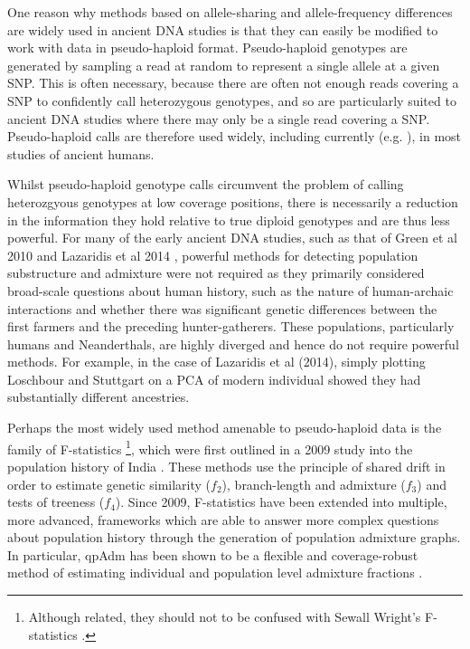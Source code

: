 One reason why methods based on allele-sharing and allele-frequency differences are widely used in ancient DNA studies is that they can easily be modified to work with data in pseudo-haploid format. Pseudo-haploid genotypes are generated by sampling a read at random to represent a single allele at a given SNP. This is often necessary, because there are often not enough reads covering a SNP to confidently call heterozygous genotypes, and so are particularly suited to ancient DNA studies where there may only be a single read covering a SNP. Pseudo-haploid calls are therefore used widely, including currently (e.g. \cite{sirak2021social}), in most studies of ancient humans. 

Whilst pseudo-haploid genotype calls circumvent the problem of calling heterozgyous genotypes at low coverage positions, there is necessarily a reduction in the information they hold relative to true diploid genotypes and are thus less powerful. For many of the early ancient DNA studies, such as that of Green et al 2010 \cite{Green2010} and Lazaridis et al 2014 \cite{Lazaridis2014}, powerful methods for detecting population substructure and admixture were not required as they primarily considered broad-scale questions about human history, such as the nature of human-archaic interactions and whether there was significant genetic differences between the first farmers and the preceding hunter-gatherers. These populations, particularly humans and Neanderthals, are highly diverged and hence do not require powerful methods. For example, in the case of Lazaridis et al (2014), simply plotting Loschbour and Stuttgart on a PCA of modern individual showed they had substantially different ancestries.

Perhaps the most widely used method amenable to pseudo-haploid data is the family of F-statistics \footnote{Although related, they should not to be confused with Sewall Wright's F-statistics \cite{wright1949genetical}.}, which were first outlined in a 2009 study into the population history of India \cite{reich2009reconstructing}. These methods use the principle of shared drift in order to estimate genetic similarity ($f_{2}$), branch-length and admixture ($f_{3}$) and tests of treeness ($f_{4}$). Since 2009, F-statistics have been extended into multiple, more advanced, frameworks which are able to answer more complex questions about population history through the generation of population admixture graphs. In particular, qpAdm has been shown to be a flexible and coverage-robust method of estimating individual and population level admixture fractions \cite{AssessingqpAdm}. 

